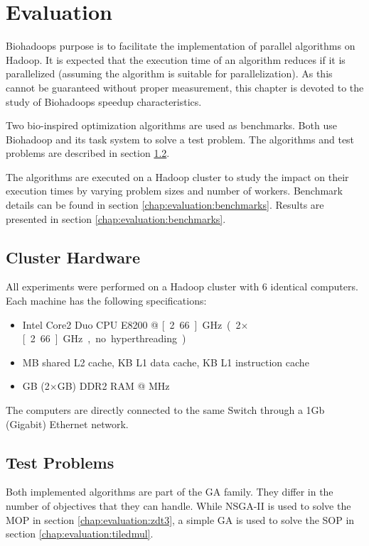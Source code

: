 \chapter{Evaluation}
\label{chap:evaluation}
Biohadoops purpose is to facilitate the implementation of parallel algorithms on Hadoop. It is expected that the execution time of an algorithm reduces if it is parallelized (assuming the algorithm is suitable for parallelization). As this cannot be guaranteed without proper measurement, this chapter is devoted to the study of Biohadoops speedup characteristics.

Two bio-inspired optimization algorithms are used as benchmarks. Both use Biohadoop and its task system to solve a test problem. The algorithms and test problems are described in section \ref{chap:evaluation:testproblems}.

The algorithms are executed on a Hadoop cluster to study the impact on their execution times by varying problem sizes and number of workers. Benchmark details can be found in section \ref{chap:evaluation:benchmarks}. Results are presented in section \ref{chap:evaluation:benchmarks}.

\section{Cluster Hardware}
All experiments were performed on a Hadoop cluster with 6 identical computers. Each machine has the following specifications:

\begin{itemize}
  \item Intel Core2 Duo CPU E8200 @ \unit[2.66]{GHz} (2$\times$\unit[2.66]{GHz}, no hyperthreading)
  \item \unit[6]{MB} shared L2 cache, \unit[32]{KB} L1 data cache, \unit[32]{KB} L1 instruction cache
  \item \unit[4]{GB} (2$\times$\unit[2]{GB}) DDR2 RAM @ \unit[667]{MHz}
\end{itemize}

The computers are directly connected to the same Switch through a 1Gb (Gigabit) Ethernet network.

\section{Test Problems}
\label{chap:evaluation:testproblems}
Both implemented algorithms are part of the GA family. They differ in the number of objectives that they can handle. While NSGA-II is used to solve the MOP in section \ref{chap:evaluation:zdt3}, a simple GA is used to solve the SOP in section \ref{chap:evaluation:tiledmul}.


